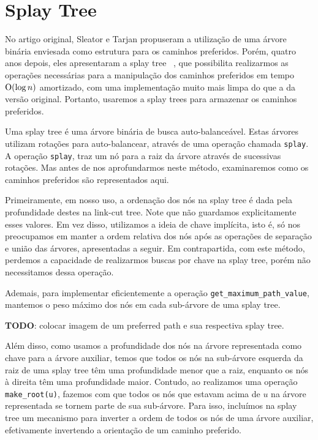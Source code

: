 \section{Splay Tree}
\label{sec:lct-splay-trees}

No artigo original, Sleator e Tarjan propuseram a utilização de uma árvore binária enviesada como estrutura para os caminhos preferidos. Porém, quatro anos depois, eles apresentaram a splay tree ~\citep{10.1145/3828.3835}, que possibilita realizarmos as operações necessárias para a manipulação dos caminhos preferidos em tempo $\mathrm{O}(\log n)$ amortizado, com uma implementação muito mais limpa do que a da versão original. Portanto, usaremos a splay trees para armazenar os caminhos preferidos.

Uma splay tree é uma árvore binária de busca auto-balanceável. Estas árvores utilizam rotações para auto-balancear, através de uma operação chamada \texttt{splay}. A operação \texttt{splay}, traz um nó para a raiz da árvore através de sucessivas rotações. Mas antes de nos aprofundarmos neste método, examinaremos como os caminhos preferidos são representados aqui.

Primeiramente, em nosso uso, a ordenação dos nós na splay tree é dada pela profundidade destes na link-cut tree. Note que não guardamos explicitamente esses valores. Em vez disso, utilizamos a ideia de chave implícita, isto é, só nos preocupamos em manter a ordem relativa dos nós após as operações de separação e união das árvores, apresentadas a seguir. Em contrapartida, com este método, perdemos a capacidade de realizarmos buscas por chave na splay tree, porém não necessitamos dessa operação.

Ademais, para implementar eficientemente a operação \texttt{get\_maximum\_path\_value}, mantemos o peso máximo dos nós em cada sub-árvore de uma splay tree.

\begin{center}
    \textbf{TODO}: colocar imagem de um preferred path e sua respectiva splay tree.
\end{center}

Além disso, como usamos a profundidade dos nós na árvore representada como chave para a árvore auxiliar, temos que todos os nós na sub-árvore esquerda da raiz de uma splay tree têm uma profundidade menor que a raiz, enquanto os nós à direita têm uma profundidade maior. Contudo, ao realizamos uma operação \texttt{make\_root(u)}, fazemos com que todos os nós que estavam acima de $u$ na árvore representada se tornem parte de sua sub-árvore. Para isso, incluímos na splay tree um mecanismo para inverter a ordem de todos os nós de uma árvore auxiliar, efetivamente invertendo a orientação de um caminho preferido.

